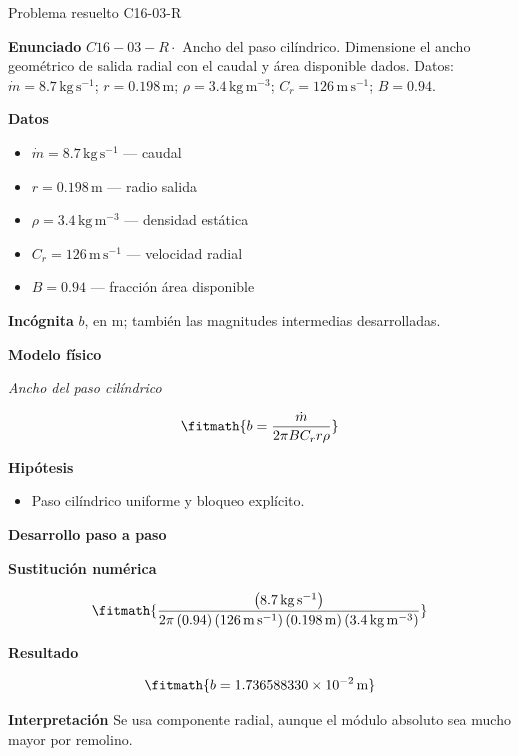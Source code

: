 \documentclass[10pt,openany]{book}
\begin{document}
\begin{studiumworked}{Problema resuelto C16-03-R}


\noindent\textbf{Enunciado}
\(C16-03-R \cdot\) Ancho del paso cilíndrico. Dimensione el ancho geométrico de salida radial con el caudal y área disponible dados. Datos: \(\dot m=8.7\, \mathrm{kg}\,\mathrm{s}^{-1}\); \(r=0.198\, \mathrm{m}\); \(\rho=3.4\, \mathrm{kg}\,\mathrm{m}^{-3}\); \(C_r=126\, \mathrm{m}\,\mathrm{s}^{-1}\); \(B=0.94\).

\noindent\textbf{Datos}
\begin{itemize}
\item $\dot m = 8.7\,\mathrm{kg}\,\mathrm{s}^{-1}$ — caudal
\item $r = 0.198\,\mathrm{m}$ — radio salida
\item $\rho = 3.4\,\mathrm{kg}\,\mathrm{m}^{-3}$ — densidad estática
\item $C_r = 126\,\mathrm{m}\,\mathrm{s}^{-1}$ — velocidad radial
\item $B = 0.94$ — fracción área disponible
\end{itemize}

\noindent\textbf{Incógnita}
$b$, en $\mathrm{m}$; también las magnitudes intermedias desarrolladas.

\noindent\textbf{Modelo físico}

\noindent\textit{Ancho del paso cilíndrico}

\[
\fitmath{b=\frac{\dot m}{2 \pi B C_r r \rho}}
\]

\noindent\textbf{Hipótesis}
\begin{itemize}
\item Paso cilíndrico uniforme y bloqueo explícito.
\end{itemize}

\noindent\textbf{Desarrollo paso a paso}



\noindent\textbf{Sustitución numérica}

\[
\fitmath{\frac{\left(8.7\,\mathrm{kg}\,\mathrm{s}^{-1}\right)}{2 \pi \left(0.94\right) \left(126\,\mathrm{m}\,\mathrm{s}^{-1}\right) \left(0.198\,\mathrm{m}\right) \left(3.4\,\mathrm{kg}\,\mathrm{m}^{-3}\right)}}
\]

\noindent\textbf{Resultado}

\[
\fitmath{b=1.736588330\times10^{-2}\,\mathrm{m}}
\]

\noindent\textbf{Interpretación}
Se usa componente radial, aunque el módulo absoluto sea mucho mayor por remolino.


\end{studiumworked}
\end{document}
